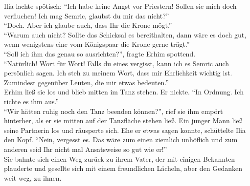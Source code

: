 Ilia lachte spötisch: ``Ich habe keine Angst vor Priestern! Sollen sie mich doch verfluchen! Ich 
mag Semric, glaubst du mir das nicht?''\\
``Doch. Aber ich glaube auch, dass Ihr die Krone mögt.''\\
``Warum auch nicht? Sollte das Schicksal es bereithalten, dann wäre es doch gut, wenn wenigstens 
eine vom Königspaar die Krone gerne trägt.''\\
``Soll ich ihm das genau so ausrichten?'', fragte Erhim spottend.\\
``Natürlich! Wort für Wort! Falls du eines vergisst, kann ich es Semric auch persönlich sagen. Ich 
steh zu meinem Wort, dass mir Ehrlichkeit wichtig ist. Zumindest gegenüber Leuten, die mir etwas 
bedeuten.''\\
Erhim ließ sie los und blieb mitten im Tanz stehen. Er nickte. ``In Ordnung. Ich richte es ihm 
aus.''\\
``Wir hätten ruhig noch den Tanz beenden können?'', rief sie ihm empört hinterher, als er sie 
mitten auf der Tanzfläche stehen ließ. Ein junger Mann ließ seine Partnerin los und räusperte sich. 
Ehe er etwas sagen konnte, schüttelte Ilia den Kopf. ``Nein, vergesst es. Das wäre zum einen 
ziemlich unhöflich und zum anderen seid Ihr nicht mal Ansatsweise so gut wie er!''\\
Sie bahnte sich einen Weg zurück zu ihrem Vater, der mit einigen Bekannten plauderte und gesellte 
sich mit einem freundlichen Lächeln, aber den Gedanken weit weg, zu ihnen.\\

